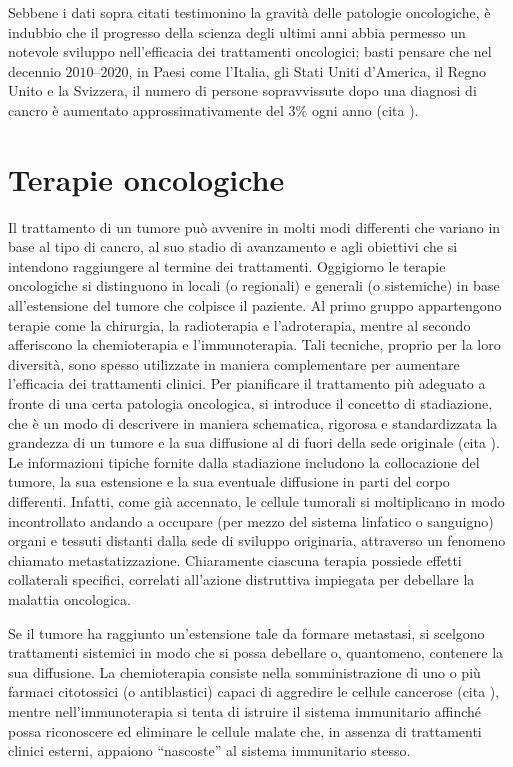 \documentclass[12pt,a4paper,twoside]{report}
\begin{document}
	Sebbene i dati sopra citati testimonino la gravità delle patologie oncologiche, è indubbio che il progresso della scienza degli ultimi anni abbia permesso un notevole sviluppo nell'efficacia dei trattamenti oncologici; basti pensare che nel decennio $2010$--$2020$, in Paesi come l'Italia, gli Stati Uniti d'America, il Regno Unito e la Svizzera, il numero di persone sopravvissute dopo una diagnosi di cancro è aumentato approssimativamente del $3\%$ ogni anno (cita
	).
	
	\section{Terapie oncologiche}\label{sec:1.2}
	Il trattamento di un tumore può avvenire in molti modi differenti che variano in base al tipo di cancro, al suo stadio di avanzamento e agli obiettivi che si intendono raggiungere al termine dei trattamenti. Oggigiorno le terapie oncologiche si distinguono in locali (o regionali) e generali (o sistemiche) in base all'estensione del tumore che colpisce il paziente. Al primo gruppo appartengono terapie come la chirurgia, la radioterapia e l'adroterapia, mentre al secondo afferiscono la chemioterapia e l'immunoterapia. Tali tecniche, proprio per la loro diversità, sono spesso utilizzate in maniera complementare per aumentare l'efficacia dei trattamenti clinici. Per pianificare il trattamento più adeguato a fronte di una certa patologia oncologica, si introduce il concetto di stadiazione, che è un modo di descrivere in maniera schematica, rigorosa e standardizzata la grandezza di un tumore e la sua diffusione al di fuori della sede originale (cita
	). Le informazioni tipiche fornite dalla stadiazione includono la collocazione del tumore, la sua estensione e la sua eventuale diffusione in parti del corpo differenti. Infatti, come già accennato, le cellule tumorali si moltiplicano in modo incontrollato andando a occupare (per mezzo del sistema linfatico o sanguigno) organi e tessuti distanti dalla sede di sviluppo originaria, attraverso un fenomeno chiamato metastatizzazione. Chiaramente ciascuna terapia possiede effetti collaterali specifici, correlati all'azione distruttiva impiegata per debellare la malattia oncologica.
	
	Se il tumore ha raggiunto un'estensione tale da formare metastasi, si scelgono trattamenti sistemici in modo che si possa debellare o, quantomeno, contenere la sua diffusione. La chemioterapia consiste nella somministrazione di uno o più farmaci citotossici (o antiblastici) capaci di aggredire le cellule cancerose (cita
	), mentre nell'immunoterapia si tenta di istruire il sistema immunitario affinché possa riconoscere ed eliminare le cellule malate che, in assenza di trattamenti clinici esterni, appaiono ``nascoste'' al sistema immunitario stesso.
	
\end{document}
